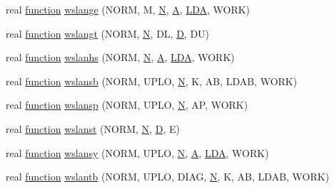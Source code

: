 \begin{DoxyCompactItemize}
\item 
real \hyperlink{afunc_8m_a7b5e596df91eadea6c537c0825e894a7}{function} \hyperlink{wrap__accelerate__f_8f_afce614ed5586561caa7664897043ed0b}{wslange} (N\+O\+R\+M, M, \hyperlink{polmisc_8c_a0240ac851181b84ac374872dc5434ee4}{N}, \hyperlink{classA}{A}, \hyperlink{example__user_8c_ae946da542ce0db94dced19b2ecefd1aa}{L\+D\+A}, W\+O\+R\+K)
\item 
real \hyperlink{afunc_8m_a7b5e596df91eadea6c537c0825e894a7}{function} \hyperlink{wrap__accelerate__f_8f_a7517d5f3acc1f237815e5203a965b328}{wslangt} (N\+O\+R\+M, \hyperlink{polmisc_8c_a0240ac851181b84ac374872dc5434ee4}{N}, D\+L, \hyperlink{odrpack_8h_a7dae6ea403d00f3687f24a874e67d139}{D}, D\+U)
\item 
real \hyperlink{afunc_8m_a7b5e596df91eadea6c537c0825e894a7}{function} \hyperlink{wrap__accelerate__f_8f_aca21507449450695ceb57c96a5dc6eca}{wslanhs} (N\+O\+R\+M, \hyperlink{polmisc_8c_a0240ac851181b84ac374872dc5434ee4}{N}, \hyperlink{classA}{A}, \hyperlink{example__user_8c_ae946da542ce0db94dced19b2ecefd1aa}{L\+D\+A}, W\+O\+R\+K)
\item 
real \hyperlink{afunc_8m_a7b5e596df91eadea6c537c0825e894a7}{function} \hyperlink{wrap__accelerate__f_8f_a31998143c327966a3eb9a52e00bda697}{wslansb} (N\+O\+R\+M, U\+P\+L\+O, \hyperlink{polmisc_8c_a0240ac851181b84ac374872dc5434ee4}{N}, K, A\+B, L\+D\+A\+B, W\+O\+R\+K)
\item 
real \hyperlink{afunc_8m_a7b5e596df91eadea6c537c0825e894a7}{function} \hyperlink{wrap__accelerate__f_8f_a68277a367fd44e48efaeb82962f1cb38}{wslansp} (N\+O\+R\+M, U\+P\+L\+O, \hyperlink{polmisc_8c_a0240ac851181b84ac374872dc5434ee4}{N}, A\+P, W\+O\+R\+K)
\item 
real \hyperlink{afunc_8m_a7b5e596df91eadea6c537c0825e894a7}{function} \hyperlink{wrap__accelerate__f_8f_a5338f88cb98fd682bd90dc56bbbb2a2c}{wslanst} (N\+O\+R\+M, \hyperlink{polmisc_8c_a0240ac851181b84ac374872dc5434ee4}{N}, \hyperlink{odrpack_8h_a7dae6ea403d00f3687f24a874e67d139}{D}, E)
\item 
real \hyperlink{afunc_8m_a7b5e596df91eadea6c537c0825e894a7}{function} \hyperlink{wrap__accelerate__f_8f_a15c72afe2883f3a8e302a9b8b743ad74}{wslansy} (N\+O\+R\+M, U\+P\+L\+O, \hyperlink{polmisc_8c_a0240ac851181b84ac374872dc5434ee4}{N}, \hyperlink{classA}{A}, \hyperlink{example__user_8c_ae946da542ce0db94dced19b2ecefd1aa}{L\+D\+A}, W\+O\+R\+K)
\item 
real \hyperlink{afunc_8m_a7b5e596df91eadea6c537c0825e894a7}{function} \hyperlink{wrap__accelerate__f_8f_a430aa98b3eefe9c8747feec14afc38b7}{wslantb} (N\+O\+R\+M, U\+P\+L\+O, D\+I\+A\+G, \hyperlink{polmisc_8c_a0240ac851181b84ac374872dc5434ee4}{N}, K, A\+B, L\+D\+A\+B, W\+O\+R\+K)

\end{DoxyCompactItemize}
